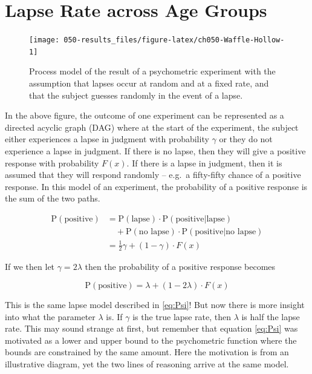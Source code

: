 \documentclass[11pt, oneside, openany]{scrbook}
\begin{document}
\hypertarget{lapse-rate-across-age-groups}{%
\section{Lapse Rate across Age Groups}\label{lapse-rate-across-age-groups}}

\begin{figure}

{\centering \texttt{[image: 050-results\_files/figure-latex/ch050-Waffle-Hollow-1]} 

}

\caption{Process model of the result of a psychometric experiment with the assumption that lapses occur at random and at a fixed rate, and that the subject guesses randomly in the event of a lapse.}\label{fig:ch050-Waffle-Hollow}
\end{figure}

In the above figure, the outcome of one experiment can be represented as a directed acyclic graph (DAG) where at the start of the experiment, the subject either experiences a lapse in judgment with probability \(\gamma\) or they do not experience a lapse in judgment. If there is no lapse, then they will give a positive response with probability \(F(x)\). If there is a lapse in judgment, then it is assumed that they will respond randomly -- e.g.~a fifty-fifty chance of a positive response. In this model of an experiment, the probability of a positive response is the sum of the two paths.

\begin{align*}
\mathrm{P}(\textrm{positive}) &= 
  \mathrm{P}(\textrm{lapse}) \cdot \mathrm{P}(\textrm{positive} | \textrm{lapse}) \\
  &\quad + \mathrm{P}(\textrm{no lapse}) \cdot \mathrm{P}(\textrm{positive} | \textrm{no lapse}) \\
  &= \frac{1}{2} \gamma + (1 - \gamma) \cdot F(x)
\end{align*}

If we then let \(\gamma = 2\lambda\) then the probability of a positive response becomes

\[
\mathrm{P}(\textrm{positive}) = \lambda + (1 - 2\lambda) \cdot F(x)
\]

This is the same lapse model described in \eqref{eq:Psi}! But now there is more insight into what the parameter \(\lambda\) is. If \(\gamma\) is the true lapse rate, then \(\lambda\) is half the lapse rate. This may sound strange at first, but remember that equation \eqref{eq:Psi} was motivated as a lower and upper bound to the psychometric function where the bounds are constrained by the same amount. Here the motivation is from an illustrative diagram, yet the two lines of reasoning arrive at the same model.
\end{document}
